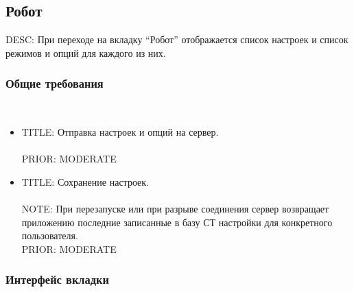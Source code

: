   \subsection{Робот} \label{driver_app_robot_tab}

    DESC: При переходе на вкладку “Робот” отображается список настроек и список режимов и опций для каждого из них.

    \subsubsection{Общие требования} \mbox{}\\

      \begin{itemize}

        \item{
          TITLE: Отправка настроек и опций на сервер.\\
          \\
          PRIOR: MODERATE\\
          }

        \item{
          TITLE: Сохранение настроек.\\
          \\
          NOTE: При перезапуске или при разрыве соединения сервер возвращает приложению последние записанные в базу СТ настройки для конкретного пользователя.\\
          PRIOR: MODERATE\\
          }

      \end{itemize}

    \subsubsection{Интерфейс вкладки} \mbox{}\\


